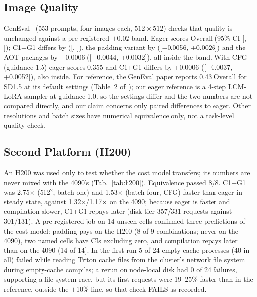 \documentclass[conference]{IEEEtran}
\newcommand{\tn}[1]{#1}%
\begin{document}
\subsection{Image Quality}\label{sec:quality}
GenEval~\cite{geneval} (553 prompts, four images each, $512{\times}512$) checks that quality is unchanged against a pre-registered $\pm0.02$ band. Eager scores \NGenEvalEZeroOverall{} Overall (95\% CI [\NGenEvalEZeroCiLo{}, \NGenEvalEZeroCiHi{}]); C1+G1 differs by \NGenEvalCOneGOneDelta{} ([\NGenEvalCOneGOneCiLo{}, \NGenEvalCOneGOneCiHi{}]), the padding variant by \NGenEvalPadDelta{} ([$-$0.0056, +0.0026]) and the AOT packages by \tn{$-$0.0006} ([$-$0.0044, +0.0032]), all inside the band. With CFG (guidance 1.5) eager scores \tn{0.355} and C1+G1 differs by \tn{+0.0006} ([$-$0.0037, +0.0052]), also inside. For reference, the GenEval paper reports 0.43 Overall for SD1.5 at its default settings (Table~2 of~\cite{geneval}); our eager reference is a 4-step LCM-LoRA sampler at guidance 1.0, so the settings differ and the two numbers are not compared directly, and our claim concerns only paired differences to eager. Other resolutions and batch sizes have numerical equivalence only, not a task-level quality check.

\subsection{Second Platform (H200)}\label{sec:h200}
An H200 was used only to test whether the cost model transfers; its numbers are never mixed with the 4090's (Tab.~\ref{tab:h200}). Equivalence passed 8/8. C1+G1 was \tn{2.75}$\times$ (512$^2$, batch one) and \tn{1.53}$\times$ (batch four, CFG) faster than eager in steady state, against \tn{1.32}$\times$/\tn{1.17}$\times$ on the 4090; because eager is faster and compilation slower, C1+G1 repays later (disk tier \tn{357}/\tn{331} requests against \tn{301}/\tn{131}). A pre-registered job on \tn{14} unseen cells confirmed three predictions of the cost model: padding pays on the H200 (\tn{8 of 9} combinations; never on the 4090), two named cells have CIs excluding zero, and compilation repays later than on the 4090 (\tn{14 of 14}). In the first run \tn{5 of 24} empty-cache processes (40 in all) failed while reading Triton cache files from the cluster's network file system during empty-cache compiles; a rerun on node-local disk had \tn{0 of 24} failures, supporting a file-system race, but its first requests were \tn{19--25\%} faster than in the reference, outside the $\pm$10\% line, so that check FAILS as recorded.
\end{document}
